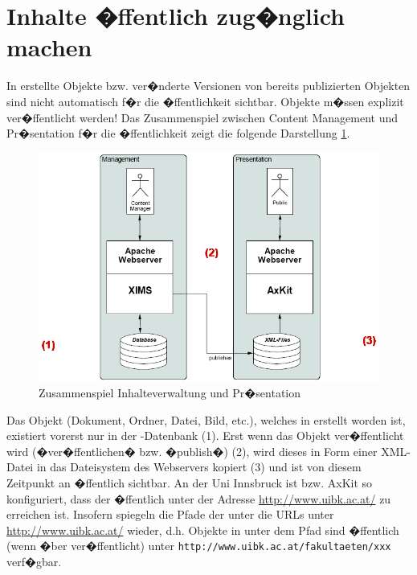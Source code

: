 \section{Inhalte �ffentlich zug�nglich machen}
\label{inhaltepublizieren}

In  erstellte Objekte bzw. ver�nderte Versionen von bereits publizierten
Objekten sind nicht automatisch f�r die �ffentlichkeit sichtbar. Objekte m�ssen
explizit ver�ffentlicht werden!
Das Zusammenspiel zwischen Content Management und Pr�sentation f�r die
�ffentlichkeit zeigt die folgende Darstellung \ref{fig:xims-zusammenspiel}.

\begin{figure}[!ht]
	\centering
		\includegraphics[width=\textwidth]{./images/xims-zusammenspiel.png}
	\caption{ Zusammenspiel
Inhalteverwaltung und Pr�sentation}
	\label{fig:xims-zusammenspiel}
\end{figure}

Das Objekt (Dokument, Ordner, Datei, Bild, etc.), welches in  erstellt worden
ist, existiert vorerst nur in der -Datenbank (1). Erst wenn das Objekt
ver�ffentlicht wird (�ver�ffentlichen� bzw. �publish�) (2), wird dieses in Form
einer XML-Datei in das Dateisystem des Webservers kopiert (3) und ist von diesem
Zeitpunkt an �ffentlich sichtbar.
An der Uni Innsbruck ist  bzw. AxKit so konfiguriert, dass der  
�ffentlich unter der Adresse \url{http://www.uibk.ac.at/} zu erreichen ist. Insofern spiegeln
die Pfade der   unter  die URLs unter
\url{http://www.uibk.ac.at/} wieder, d.h. Objekte in  unter dem Pfad
 sind �ffentlich (wenn �ber  ver�ffentlicht) unter
\nolinkurl{http://www.uibk.ac.at/fakultaeten/xxx} verf�gbar.

